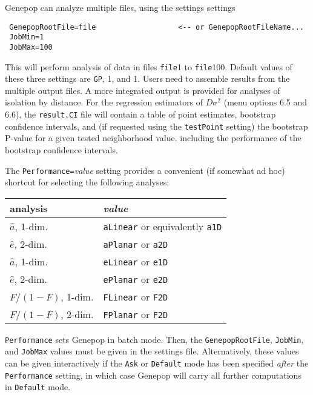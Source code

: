 \documentclass[
  12pt,
]{book}
\begin{document}
Genepop can analyze multiple files, using the settings settings

\begin{verbatim}
 GenepopRootFile=file                   <-- or GenepopRootFileName...
 JobMin=1
 JobMax=100
\end{verbatim}

This will perform analysis of data in files \texttt{file}1 to \texttt{file}100. Default values of these three settings are \texttt{GP}, 1, and 1. Users need to assemble results from the multiple output files. A more integrated output is provided for analyses of isolation by distance. For the regression estimators of \(D\sigma^2\) (menu options 6.5 and 6.6), the \texttt{result.CI} file will contain a table of point estimates, bootstrap confidence intervals, and (if requested using the \texttt{testPoint} setting) the bootstrap P-value for a given tested neighborhood value. including the performance of the bootstrap confidence intervals.

The \texttt{Performance=}\emph{value} setting provides a convenient (if somewhat ad hoc) shortcut for selecting the following analyses:

\begin{longtable}[]{@{}ll@{}}
\toprule()
analysis & \emph{value} \\
\midrule()
\endhead
\(\hat{a}\), 1-dim. & \texttt{aLinear} or equivalently \texttt{a1D} \\
\(\hat{e}\), 2-dim. & \texttt{aPlanar} or \texttt{a2D} \\
\(\hat{a}\), 1-dim. & \texttt{eLinear} or \texttt{e1D} \\
\(\hat{e}\), 2-dim. & \texttt{ePlanar} or \texttt{e2D} \\
\(F/(1-F)\), 1-dim. & \texttt{FLinear} or \texttt{F2D} \\
\(F/(1-F)\), 2-dim. & \texttt{FPlanar} or \texttt{F2D} \\
\bottomrule()
\end{longtable}

\texttt{Performance} sets Genepop in batch mode. Then, the \texttt{GenepopRootFile}, \texttt{JobMin}, and \texttt{JobMax} values must be given in the settings file. Alternatively, these values can be given interactively if the \texttt{Ask} or \texttt{Default} mode  has been specified \emph{after} the \texttt{Performance} setting, in which case Genepop will carry all further computations in \texttt{Default} mode.
\end{document}
